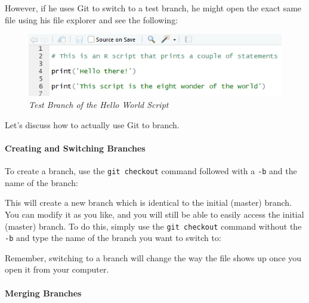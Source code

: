 \documentclass[
]{book}
\newenvironment{Shaded}{\begin{snugshade}}{\end{snugshade}}
\newcommand{\NormalTok}[1]{#1}
\newcommand{\SpecialCharTok}[1]{\textcolor[rgb]{0.00,0.00,0.00}{#1}}
\begin{document}
However, if he uses Git to switch to a test branch, he might open the exact same file using his file explorer and see the following:

\begin{figure}
\centering
\includegraphics{images/hello2.PNG}
\caption{\emph{Test Branch of the Hello World Script}}
\end{figure}

Let's discuss how to actually use Git to branch.

\hypertarget{creating-and-switching-branches}{%
\paragraph{Creating and Switching Branches}\label{creating-and-switching-branches}}

To create a branch, use the \texttt{git\ checkout} command followed with a \texttt{-b} and the name of the branch:

\begin{Shaded}
\end{Shaded}

This will create a new branch which is identical to the initial (master) branch. You can modify it as you like, and you will still be able to easily access the initial (master) branch. To do this, simply use the \texttt{git\ checkout} command without the \texttt{-b} and type the name of the branch you want to switch to:

\begin{Shaded}
\end{Shaded}

Remember, switching to a branch will change the way the file shows up once you open it from your computer.

\hypertarget{merging-branches}{%
\paragraph{Merging Branches}\label{merging-branches}}
\end{document}

